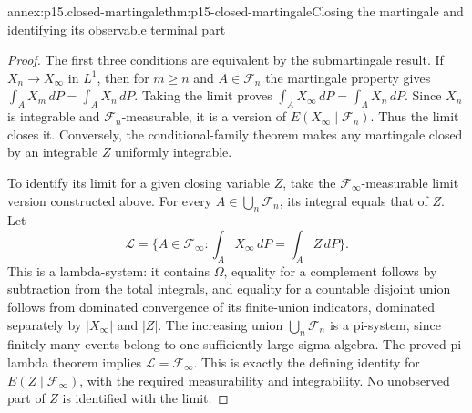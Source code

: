 \begin{annexitem}{annex:p15.closed-martingale}{thm:p15-closed-martingale}{Closing the martingale and identifying its observable terminal part}
\begin{proof}
The first three conditions are equivalent by the submartingale result.
If \(X_n\to X_\infty\) in \(L^1\), then for \(m\geq n\) and
\(A\in\mathcal F_n\) the martingale property gives
\(\int_A X_m\,dP=\int_A X_n\,dP\).
Taking the limit proves
\(\int_A X_\infty\,dP=\int_A X_n\,dP\).
Since \(X_n\) is integrable and \(\mathcal F_n\)-measurable, it is a
version of \(E(X_\infty\mid\mathcal F_n)\). Thus the limit closes it.
Conversely, the conditional-family theorem makes any martingale
closed by an integrable \(Z\) uniformly integrable.

To identify its limit for a given closing variable \(Z\), take the
\(\mathcal F_\infty\)-measurable limit version constructed above.
For every \(A\in\bigcup_n\mathcal F_n\), its integral equals that of \(Z\).
Let
\[
       \mathcal L=\{A\in\mathcal F_\infty:
                              \int_A X_\infty\,dP=\int_A Z\,dP\}.
\]
This is a lambda-system: it contains \(\Omega\), equality for a complement
follows by subtraction from the total integrals, and equality for a
countable disjoint union follows from dominated convergence of its
finite-union indicators, dominated separately by \(|X_\infty|\) and \(|Z|\).
The increasing union \(\bigcup_n\mathcal F_n\) is a pi-system,
since finitely many events belong to one sufficiently large sigma-algebra.
The proved pi-lambda theorem implies
\(\mathcal L=\mathcal F_\infty\). This is exactly the defining identity
for \(E(Z\mid\mathcal F_\infty)\), with the required measurability and
integrability. No unobserved part of \(Z\) is identified with the limit.
\end{proof}
\end{annexitem}

